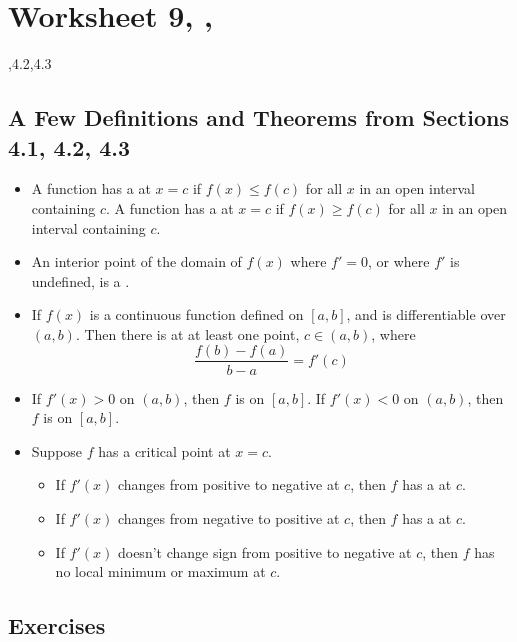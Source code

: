 \newpage\section*{Worksheet 9, \Course, \Semester} 
\noindent {},4.2,4.3

\subsection*{A Few Definitions and Theorems from Sections 4.1, 4.2, 4.3}

	\begin{itemize}
    	\item {} A function has a  at $x = c$ if $f(x) \le f(c)$ for all $x$ in an open interval containing $c$. A function has a  at $x = c$ if $f(x) \ge f(c)$ for all $x$ in an open interval containing $c$. 
        \item {} An interior point of the domain of $f(x)$ where $f'=0$, or where $f'$ is undefined, is a . 
        \item {} If $f(x)$ is a continuous function defined on $[a,b]$, and is differentiable over $(a,b)$. Then there is at at least one point, $c \in (a,b)$, where 
        $$\frac{f(b)-f(a)}{b-a} = f'(c)$$ 
        \item {} If $f'(x) > 0$ on $(a,b)$, then $f$ is  on $[a,b]$. If $f'(x) < 0$ on $(a,b)$, then $f$ is  on $[a,b]$.
        \item {} Suppose $f$ has a critical point at $x=c$.
        \begin{itemize}
            \item If $f'(x)$ changes from positive to negative at $c$, then $f$ has a  at $c$.
            \item If $f'(x)$ changes from negative to positive at $c$, then $f$ has a  at $c$.
            \item If $f'(x)$ doesn't change sign from positive to negative at $c$, then $f$ has no local minimum or maximum at $c$.
        \end{itemize}
    \end{itemize}
    
\subsection*{Exercises}

